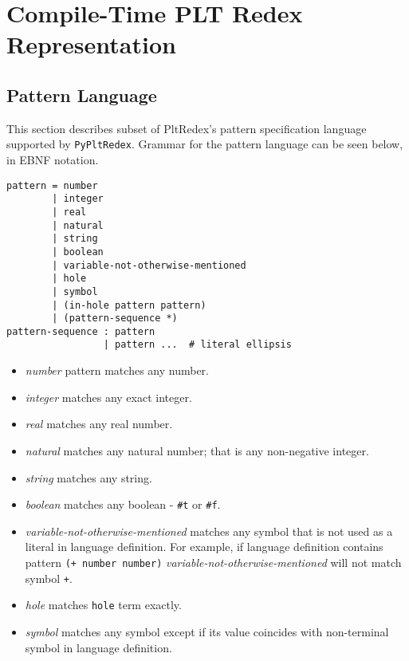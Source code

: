 \chapter{Compile-Time PLT Redex Representation}

\section{Pattern Language}

This section describes subset of PltRedex's pattern specification language supported by \texttt{PyPltRedex}. Grammar for the pattern language can be seen below, in EBNF notation. 

\begin{lstlisting}
pattern = number 
        | integer 
		| real 
		| natural 
		| string 
		| boolean 
		| variable-not-otherwise-mentioned 
		| hole 
		| symbol
        | (in-hole pattern pattern)
        | (pattern-sequence *) 
pattern-sequence : pattern 
                 | pattern ...  # literal ellipsis
\end{lstlisting}

\begin{itemize}
\item
\textit{number} pattern matches any number.

\item
\textit{integer} matches any exact integer. 

\item
\textit{real} matches any real number.

\item
\textit{natural} matches any natural number; that is any non-negative integer.

\item
\textit{string} matches any string.

\item
\textit{boolean} matches any boolean - \texttt{\#t} or \texttt{\#f}.
\item
\textit{variable-not-otherwise-mentioned} matches any symbol that is not used as a literal in language definition. For example, if language definition contains pattern \texttt{(+ number number)} \textit{variable-not-otherwise-mentioned} will not match symbol \texttt{+}.

\item
\textit{hole} matches \texttt{hole} term exactly.

\item
\textit{symbol} matches any symbol except if its value coincides with non-terminal symbol in language definition.
\end{itemize}

